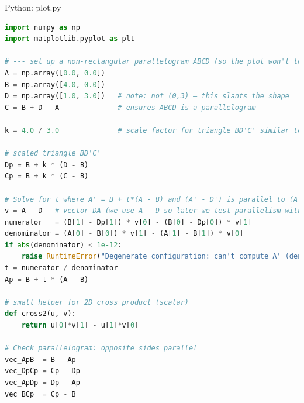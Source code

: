 \documentclass{beamer}
\numberwithin{equation}{section}
\theoremstyle{remark}
\begin{document}
\begin{frame}[fragile]{Python: plot.py}
\begin{lstlisting}[language=Python]
   import numpy as np
import matplotlib.pyplot as plt

# --- set up a non-rectangular parallelogram ABCD (so the plot won't look square)
A = np.array([0.0, 0.0])
B = np.array([4.0, 0.0])
D = np.array([1.0, 3.0])   # note: not (0,3) — this slants the shape
C = B + D - A              # ensures ABCD is a parallelogram

k = 4.0 / 3.0              # scale factor for triangle BD'C' similar to BDC

# scaled triangle BD'C'
Dp = B + k * (D - B)
Cp = B + k * (C - B)

# Solve for t where A' = B + t*(A - B) and (A' - D') is parallel to (A - D)
v = A - D   # vector DA (we use A - D so later we test parallelism with A' - D')
numerator   = (B[1] - Dp[1]) * v[0] - (B[0] - Dp[0]) * v[1]
denominator = (A[0] - B[0]) * v[1] - (A[1] - B[1]) * v[0]
if abs(denominator) < 1e-12:
    raise RuntimeError("Degenerate configuration: can't compute A' (denominator ~ 0).")
t = numerator / denominator
Ap = B + t * (A - B)

# small helper for 2D cross product (scalar)
def cross2(u, v):
    return u[0]*v[1] - u[1]*v[0]

# Check parallelogram: opposite sides parallel
vec_ApB  = B - Ap
vec_DpCp = Cp - Dp
vec_ApDp = Dp - Ap
vec_BCp  = Cp - B
\end{lstlisting}
\end{frame}  
\end{document}
